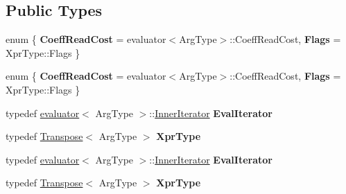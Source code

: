 \subsection*{Public Types}
\begin{DoxyCompactItemize}
\item 
\mbox{\label{struct_eigen_1_1internal_1_1unary__evaluator_3_01_transpose_3_01_arg_type_01_4_00_01_iterator_based_01_4_afa0b6f6d4348eed8591e866d8779ebed}} 
enum \{ {\bfseries Coeff\+Read\+Cost} = evaluator$<$Arg\+Type$>$\+:\+:Coeff\+Read\+Cost, 
{\bfseries Flags} = Xpr\+Type\+:\+:Flags
 \}
\item 
\mbox{\label{struct_eigen_1_1internal_1_1unary__evaluator_3_01_transpose_3_01_arg_type_01_4_00_01_iterator_based_01_4_a0ce958f12e7f4c36922e9341678118d4}} 
enum \{ {\bfseries Coeff\+Read\+Cost} = evaluator$<$Arg\+Type$>$\+:\+:Coeff\+Read\+Cost, 
{\bfseries Flags} = Xpr\+Type\+:\+:Flags
 \}
\item 
\mbox{\label{struct_eigen_1_1internal_1_1unary__evaluator_3_01_transpose_3_01_arg_type_01_4_00_01_iterator_based_01_4_aac683dac39921323bcc00b3a49b7d20c}} 
typedef \hyperlink{struct_eigen_1_1internal_1_1evaluator}{evaluator}$<$ Arg\+Type $>$\+::\hyperlink{class_eigen_1_1_inner_iterator}{Inner\+Iterator} {\bfseries Eval\+Iterator}
\item 
\mbox{\label{struct_eigen_1_1internal_1_1unary__evaluator_3_01_transpose_3_01_arg_type_01_4_00_01_iterator_based_01_4_ac44f8c6163e7d7d86b6522422953e32d}} 
typedef \hyperlink{group___core___module_class_eigen_1_1_transpose}{Transpose}$<$ Arg\+Type $>$ {\bfseries Xpr\+Type}
\item 
\mbox{\label{struct_eigen_1_1internal_1_1unary__evaluator_3_01_transpose_3_01_arg_type_01_4_00_01_iterator_based_01_4_aac683dac39921323bcc00b3a49b7d20c}} 
typedef \hyperlink{struct_eigen_1_1internal_1_1evaluator}{evaluator}$<$ Arg\+Type $>$\+::\hyperlink{class_eigen_1_1_inner_iterator}{Inner\+Iterator} {\bfseries Eval\+Iterator}
\item 
\mbox{\label{struct_eigen_1_1internal_1_1unary__evaluator_3_01_transpose_3_01_arg_type_01_4_00_01_iterator_based_01_4_ac44f8c6163e7d7d86b6522422953e32d}} 
typedef \hyperlink{group___core___module_class_eigen_1_1_transpose}{Transpose}$<$ Arg\+Type $>$ {\bfseries Xpr\+Type}
\end{DoxyCompactItemize}
